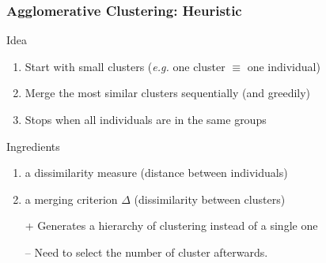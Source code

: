 \documentclass{beamer}\usepackage[]{graphicx}\usepackage[]{color}
\begin{document}
\begin{frame}
  \frametitle{Agglomerative Clustering: Heuristic}
    
    \begin{block}{Idea}
      \begin{enumerate}
        \item Start with small clusters (\textit{e.g.} one cluster $\equiv$ one individual)
        \item Merge the most similar clusters sequentially (and greedily)
        \item Stops when all individuals are in the same groups
      \end{enumerate}
    \end{block}

    \begin{block}{Ingredients}
      \begin{enumerate}
        \item a dissimilarity measure (distance between individuals)
        \item a merging criterion $\Delta$ (dissimilarity between clusters)
      \end{enumerate}
    \end{block}

    \begin{itemize}
      \item[+] Generates a hierarchy of clustering instead of a single one
      \item[--] Need to select the number of cluster afterwards.
    \end{itemize}
\end{frame}
\end{document}
